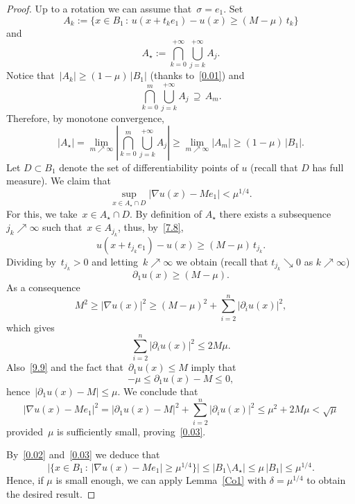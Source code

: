 \documentclass[11pt]{amsart}
\begin{document}
\begin{proof}

Up to a rotation we can assume that~$\sigma=e_1$.
Set
\begin{equation}\label{7.8}
A_k:=\big\{x\in B_1 \,:\,
u(x+t_k e_1)-u(x){\geqslant} (M-\mu)\,t_k
\big\}\end{equation}
and
$$ A_\star :=\bigcap_{k=0}^{+\infty} \bigcup_{j=k}^{+\infty} A_j.$$
Notice that~$|A_k|{\geqslant}(1-\mu)\,|B_1|$ (thanks to~\eqref{0.01}) and
$$ \bigcap_{k=0}^{m} \bigcup_{j=k}^{+\infty} A_j\,\supseteq\, A_m.$$
Therefore, by monotone convergence,
\begin{equation}\label{0.02} |A_\star|=\lim_{m\nearrow\infty}
\left|\bigcap_{k=0}^{m} \bigcup_{j=k}^{+\infty} A_j
\right|{\geqslant} 
\lim_{m\nearrow\infty}|A_m|{\geqslant}(1-\mu)\,|B_1|.\end{equation}
Let $D\subset B_1$ denote the set of differentiability points of $u$ (recall that $D$ has full measure).
We claim that
\begin{equation}\label{0.03}
\sup_{x\in A_\star\cap D} |\nabla 
u(x)-Me_1|<\mu^{1/4}.\end{equation}
For this, we take~$x\in A_\star\cap D$. By definition of $A_\star$ there 
exists a subsequence $j_k\nearrow \infty$ such that~$x\in A_{j_k}$, thus,
by~\eqref{7.8},
$$ u(x+t_{j_k} e_1)-u(x){\geqslant} (M-\mu)\,t_{j_k}.$$
Dividing by~$t_{j_k}>0$ and letting~$k\nearrow\infty$ we obtain (recall that $t_{j_k}\searrow 0$ as $k \nearrow \infty$)
\begin{equation}\label{9.9}
\partial_1 u(x){\geqslant} (M-\mu).\end{equation}
As a consequence
$$ M^2{\geqslant} |\nabla u(x)|^2{\geqslant} (M-\mu)^2+\sum_{i=2}^n |\partial_i u(x)|^2,$$
which gives
$$ \sum_{i=2}^n |\partial_i u(x)|^2{\leqslant} 2M\mu.$$
Also~\eqref{9.9} and the fact that~$\partial_1 u(x){\leqslant} M$ imply that
$$ -\mu{\leqslant}\partial_1 u(x)-M{\leqslant} 0,$$
hence~$|\partial_1 u(x)-M|{\leqslant}\mu$. We conclude that
$$ |\nabla u(x)-Me_1|^2=
|\partial_1 u(x)-M|^2+\sum_{i=2}^n |\partial_i u(x)|^2{\leqslant}
\mu^2+2M\mu< \sqrt\mu$$
provided~$\mu$ is sufficiently small, proving~\eqref{0.03}.

By~\eqref{0.02} and~\eqref{0.03} we deduce that
$$ \Big| \big\{ x\in B_1 \,:\,
|\nabla u(x)-Me_1|{\geqslant}\mu^{1/4}\big\}\Big|{\leqslant}
|B_1\setminus A_\star|{\leqslant} \mu\,|B_1|{\leqslant}\mu^{1/4}.$$
Hence, if $\mu$ is small enough, we can apply 
Lemma~\ref{Co1} with $\delta=\mu^{1/4}$ to obtain the desired result.
\end{proof}
\end{document}
